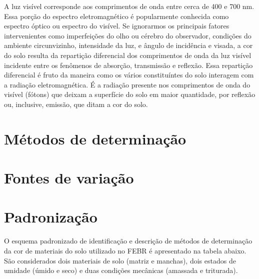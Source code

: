 \documentclass[
]{book}
\begin{document}
A luz visível corresponde aos comprimentos de onda entre cerca de 400 e 700 nm. Essa porção do espectro eletromagnético é popularmente conhecida como espectro óptico ou espectro do visível. Se ignorarmos os principais fatores intervenientes como imperfeições do olho ou cérebro do observador, condições do ambiente circunvizinho, intensidade da luz, e ângulo de incidência e visada, a cor do solo resulta da repartição diferencial dos comprimentos de onda da luz visível incidente entre os fenômenos de absorção, transmissão e reflexão. Essa repartição diferencial é fruto da maneira como os vários constituíntes do solo interagem com a radiação eletromagnética. É a radiação presente nos comprimentos de onda do visível (fótons) que deixam a superfície do solo em maior quantidade, por reflexão ou, inclusive, emissão, que ditam a cor do solo.

\hypertarget{muxe9todos-de-determinauxe7uxe3o}{%
\section{Métodos de determinação}\label{muxe9todos-de-determinauxe7uxe3o}}

\hypertarget{fontes-de-variauxe7uxe3o}{%
\section{Fontes de variação}\label{fontes-de-variauxe7uxe3o}}

\hypertarget{padronizauxe7uxe3o}{%
\section{Padronização}\label{padronizauxe7uxe3o}}

O esquema padronizado de identificação e descrição de métodos de determinação da cor de materiais do solo utilizado no FEBR é apresentado na tabela abaixo. São considerados dois materiais de solo (matriz e manchas), dois estados de umidade (úmido e seco) e duas condições mecânicas (amassada e triturada).
\end{document}
